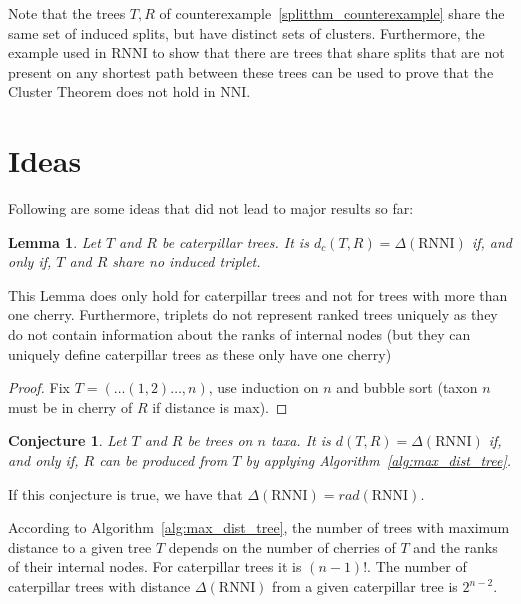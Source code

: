 \documentclass{amsart}
\newcommand{\nni}{\mathrm{NNI}}
\newcommand{\rnni}{\mathrm{RNNI}}
\newtheorem{conjecture}[definition]{Conjecture}
\newtheorem{lemma}[definition]{Lemma}
\begin{document}
Note that the trees $T, R$ of counterexample~\ref{splitthm_counterexample} share the same set of induced splits, but have distinct sets of clusters.
Furthermore, the example used in $\rnni$ to show that there are trees that share splits that are not present on any shortest path between these trees can be used to prove that the Cluster Theorem does not hold in $\nni$.


\section{Ideas}

Following are some ideas that did not lead to major results so far:

\begin{lemma}
    Let $T$ and $R$ be caterpillar trees.
    It is $d_c(T,R) = \Delta(\rnni)$ if, and only if, $T$ and $R$ share no induced triplet.
\end{lemma}

This Lemma does only hold for caterpillar trees and not for trees with more than one cherry.
Furthermore, triplets do not represent ranked trees uniquely as they do not contain information about the ranks of internal nodes (but they can uniquely define caterpillar trees as these only have one cherry)

\begin{proof}
    Fix $T = (\ldots(1,2) \ldots ,n)$, use induction on $n$ and bubble sort (taxon $n$ must be in cherry of $R$ if distance is max).
\end{proof}

\begin{conjecture}
    Let $T$ and $R$ be trees on $n$ taxa.
    It is $d(T,R) = \Delta(\rnni)$ if, and only if, $R$ can be produced from $T$ by applying Algorithm~\ref{alg:max_dist_tree}.
\end{conjecture}

If this conjecture is true, we have that $\Delta(\rnni) = rad(\rnni)$.

According to Algorithm~\ref{alg:max_dist_tree}, the number of trees with maximum distance to a given tree $T$ depends on the number of cherries of $T$ and the ranks of their internal nodes.
For caterpillar trees it is $(n-1)!$.
The number of caterpillar trees with distance $\Delta(\rnni)$ from a given caterpillar tree is $2^{n-2}$.
\end{document}
